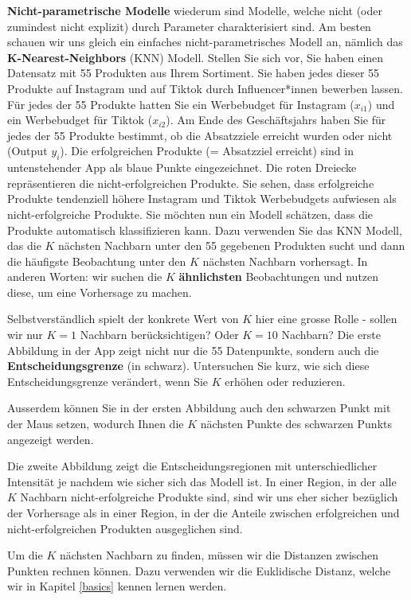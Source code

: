 \documentclass[
]{book}
\begin{document}
\textbf{Nicht-parametrische Modelle} wiederum sind Modelle, welche nicht (oder zumindest nicht explizit) durch Parameter charakterisiert sind. Am besten schauen wir uns gleich ein einfaches nicht-parametrisches Modell an, nämlich das \textbf{K-Nearest-Neighbors} (KNN) Modell. Stellen Sie sich vor, Sie haben einen Datensatz mit 55 Produkten aus Ihrem Sortiment. Sie haben jedes dieser 55 Produkte auf Instagram und auf Tiktok durch Influencer*innen bewerben lassen. Für jedes der 55 Produkte hatten Sie ein Werbebudget für Instagram (\(x_{i1}\)) und ein Werbebudget für Tiktok (\(x_{i2}\)). Am Ende des Geschäftsjahrs haben Sie für jedes der 55 Produkte bestimmt, ob die Absatzziele erreicht wurden oder nicht (Output \(y_i\)). Die erfolgreichen Produkte (= Absatzziel erreicht) sind in untenstehender App als blaue Punkte eingezeichnet. Die roten Dreiecke repräsentieren die nicht-erfolgreichen Produkte. Sie sehen, dass erfolgreiche Produkte tendenziell höhere Instagram und Tiktok Werbebudgets aufwiesen als nicht-erfolgreiche Produkte. Sie möchten nun ein Modell schätzen, dass die Produkte automatisch klassifizieren kann. Dazu verwenden Sie das KNN Modell, das die \(K\) nächsten Nachbarn unter den 55 gegebenen Produkten sucht und dann die häufigste Beobachtung unter den \(K\) nächsten Nachbarn vorhersagt. In anderen Worten: wir suchen die \(K\) \textbf{ähnlichsten} Beobachtungen und nutzen diese, um eine Vorhersage zu machen.

Selbstverständlich spielt der konkrete Wert von \(K\) hier eine grosse Rolle - sollen wir nur \(K=1\) Nachbarn berücksichtigen? Oder \(K=10\) Nachbarn? Die erste Abbildung in der App zeigt nicht nur die 55 Datenpunkte, sondern auch die \textbf{Entscheidungsgrenze} (in schwarz). Untersuchen Sie kurz, wie sich diese Entscheidungsgrenze verändert, wenn Sie \(K\) erhöhen oder reduzieren.

Ausserdem können Sie in der ersten Abbildung auch den schwarzen Punkt mit der Maus setzen, wodurch Ihnen die \(K\) nächsten Punkte des schwarzen Punkts angezeigt werden.

Die zweite Abbildung zeigt die Entscheidungsregionen mit unterschiedlicher Intensität je nachdem wie sicher sich das Modell ist. In einer Region, in der alle \(K\) Nachbarn nicht-erfolgreiche Produkte sind, sind wir uns eher sicher bezüglich der Vorhersage als in einer Region, in der die Anteile zwischen erfolgreichen und nicht-erfolgreichen Produkten ausgeglichen sind.

Um die \(K\) nächsten Nachbarn zu finden, müssen wir die Distanzen zwischen Punkten rechnen können. Dazu verwenden wir die Euklidische Distanz, welche wir in Kapitel \ref{basics} kennen lernen werden.
\end{document}

